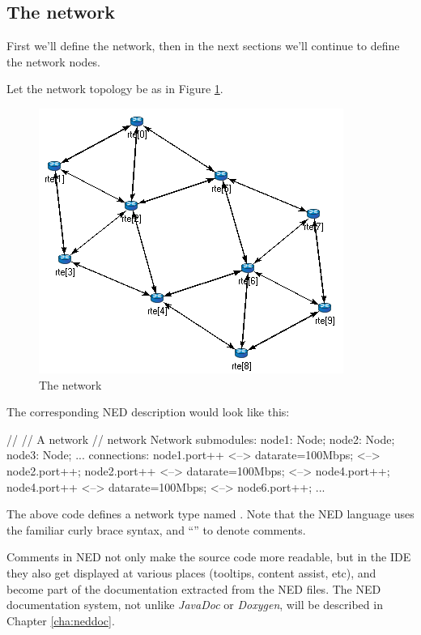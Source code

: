 
\subsection{The network}
\label{sec:ch-ned-lang:warmup:network}

First we'll define the network, then in the next sections we'll continue
to define the network nodes.

Let the network topology be as in Figure \ref{fig:ned-routing-topology}.

\begin{figure}[htbp]
  \centering
  \includegraphics[scale=0.6]{figures/ned-routing-network}
  \caption{The network}
  \label{fig:ned-routing-topology}
\end{figure}

The corresponding NED description would look like this:

\begin{ned}
//
// A network
//
network Network
{
    submodules:
        node1: Node;
        node2: Node;
        node3: Node;
        ...
    connections:
        node1.port++ <--> {datarate=100Mbps;} <--> node2.port++;
        node2.port++ <--> {datarate=100Mbps;} <--> node4.port++;
        node4.port++ <--> {datarate=100Mbps;} <--> node6.port++;
        ...
}
\end{ned}

The above code defines a network type named . Note that the NED
language uses the familiar curly brace syntax, and ``\ttt{//}'' to denote
comments.

\begin{note}
    Comments in NED not only make the source code more readable, but in the
    {\opp} IDE they also get displayed at various places (tooltips, content
    assist, etc), and become part of the documentation extracted from the NED
    files. The NED documentation system, not unlike \textit{JavaDoc} or
    \textit{Doxygen}, will be described in Chapter \ref{cha:neddoc}.
\end{note}

